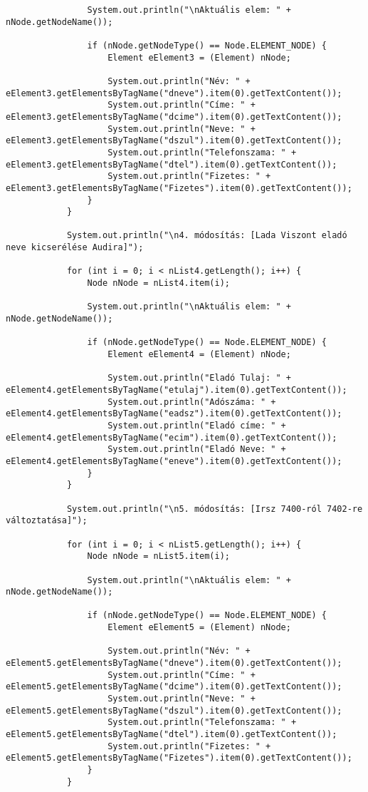 \documentclass[14pt]{extarticle}
\begin{document}
\begin{normalsize}
\begin{verbatim}
	            System.out.println("\nAktuális elem: " + nNode.getNodeName());

	            if (nNode.getNodeType() == Node.ELEMENT_NODE) {
	                Element eElement3 = (Element) nNode;

	                System.out.println("Név: " + eElement3.getElementsByTagName("dneve").item(0).getTextContent());
	                System.out.println("Címe: " + eElement3.getElementsByTagName("dcime").item(0).getTextContent());
	                System.out.println("Neve: " + eElement3.getElementsByTagName("dszul").item(0).getTextContent());
	                System.out.println("Telefonszama: " + eElement3.getElementsByTagName("dtel").item(0).getTextContent());
	                System.out.println("Fizetes: " + eElement3.getElementsByTagName("Fizetes").item(0).getTextContent());
	            }
	        }
			
			System.out.println("\n4. módosítás: [Lada Viszont eladó neve kicserélése Audira]");
			
			for (int i = 0; i < nList4.getLength(); i++) {
	            Node nNode = nList4.item(i);

	            System.out.println("\nAktuális elem: " + nNode.getNodeName());

	            if (nNode.getNodeType() == Node.ELEMENT_NODE) {
	                Element eElement4 = (Element) nNode;

	                System.out.println("Eladó Tulaj: " + eElement4.getElementsByTagName("etulaj").item(0).getTextContent());
	                System.out.println("Adószáma: " + eElement4.getElementsByTagName("eadsz").item(0).getTextContent());
	                System.out.println("Eladó címe: " + eElement4.getElementsByTagName("ecim").item(0).getTextContent());
	                System.out.println("Eladó Neve: " + eElement4.getElementsByTagName("eneve").item(0).getTextContent());
	            }
	        }
			
			System.out.println("\n5. módosítás: [Irsz 7400-ról 7402-re változtatása]");
			
			for (int i = 0; i < nList5.getLength(); i++) {
	            Node nNode = nList5.item(i);

	            System.out.println("\nAktuális elem: " + nNode.getNodeName());

	            if (nNode.getNodeType() == Node.ELEMENT_NODE) {
	                Element eElement5 = (Element) nNode;

	                System.out.println("Név: " + eElement5.getElementsByTagName("dneve").item(0).getTextContent());
	                System.out.println("Címe: " + eElement5.getElementsByTagName("dcime").item(0).getTextContent());
	                System.out.println("Neve: " + eElement5.getElementsByTagName("dszul").item(0).getTextContent());
	                System.out.println("Telefonszama: " + eElement5.getElementsByTagName("dtel").item(0).getTextContent());
	                System.out.println("Fizetes: " + eElement5.getElementsByTagName("Fizetes").item(0).getTextContent());
	            }
	        }
	        

\end{verbatim}
\end{normalsize}
\end{document}
